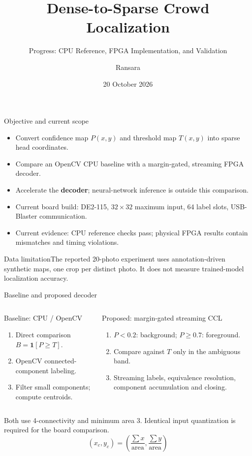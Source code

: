 \documentclass[aspectratio=169,10pt]{beamer}
\title{Dense-to-Sparse Crowd Localization}
\subtitle{Progress: CPU Reference, FPGA Implementation, and Validation}
\author{Ransara}
\date{20 October 2026}
\begin{document}
\begin{frame}\titlepage\end{frame}

\begin{frame}{Objective and current scope}
\begin{itemize}
\item Convert confidence map $P(x,y)$ and threshold map $T(x,y)$ into sparse head coordinates.
\item Compare an OpenCV CPU baseline with a margin-gated, streaming FPGA decoder.
\item Accelerate the \textbf{decoder}; neural-network inference is outside this comparison.
\item Current board build: DE2-115, $32\times32$ maximum input, 64 label slots, USB-Blaster communication.
\item Current evidence: CPU reference checks pass; physical FPGA results contain mismatches and timing violations.
\end{itemize}
\begin{block}{Data limitation}The reported 20-photo experiment uses annotation-driven synthetic maps, one crop per distinct photo. It does not measure trained-model localization accuracy.\end{block}
\end{frame}

\begin{frame}{Baseline and proposed decoder}
\begin{columns}[T]
\begin{block}{Baseline: CPU / OpenCV}
\begin{enumerate}
\item Direct comparison $B=\mathbf{1}[P\geq T]$.
\item OpenCV connected-component labeling.
\item Filter small components; compute centroids.
\end{enumerate}
\end{block}
\begin{block}{Proposed: margin-gated streaming CCL}
\begin{enumerate}
\item $P<0.2$: background; $P\geq0.7$: foreground.
\item Compare against $T$ only in the ambiguous band.
\item Streaming labels, equivalence resolution, component accumulation and closing.
\end{enumerate}
\end{block}
\end{columns}
\medskip
Both use 4-connectivity and minimum area 3. Identical input quantization is required for the board comparison.
\[
(x_c,y_c)=\left(\frac{\sum x}{\mathrm{area}},\frac{\sum y}{\mathrm{area}}\right)
\]
\end{frame}
\end{document}
